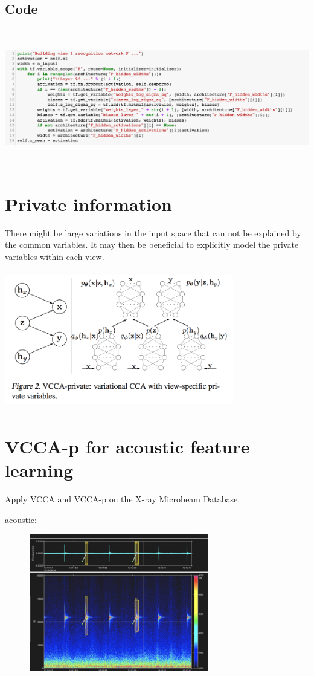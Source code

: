\documentclass[a4paper]{article}
\begin{document}
\subsection{Code}

\includegraphics[width=17cm, height=6cm]{dnn_code.png}

\section{Private information}
There might be large variations in the input space that can not be explained by the common variables. It may then be beneficial to explicitly model the private variables within each view.
\begin{center}
\includegraphics[width=10cm, height=6cm]{vcca-p.png}
\end{center}

\section{VCCA-p for acoustic feature learning}

Apply VCCA and VCCA-p on the X-ray Microbeam Database.

acoustic:
\begin{center}
\includegraphics[width=10cm, height=6cm]{acous.png}
\end{center}
\end{document}

